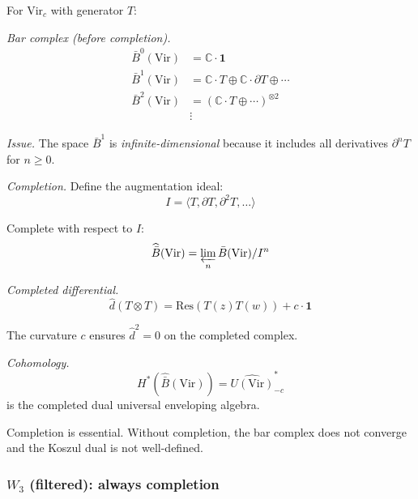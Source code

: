 \begin{example}\label{ex:vir-bar-completion}
For $\text{Vir}_c$ with generator $T$:

\emph{Bar complex (before completion).}
\begin{align}
\bar{B}^0(\text{Vir}) &= \mathbb{C} \cdot \mathbf{1} \\
\bar{B}^1(\text{Vir}) &= \mathbb{C} \cdot T \oplus \mathbb{C} \cdot \partial T \oplus \cdots \\
\bar{B}^2(\text{Vir}) &= (\mathbb{C} \cdot T \oplus \cdots)^{\otimes 2} \\
&\vdots
\end{align}

\emph{Issue.} The space $\bar{B}^1$ is \emph{infinite-dimensional} because it includes 
all derivatives $\partial^n T$ for $n \geq 0$.

\emph{Completion.} Define the augmentation ideal:
\[I = \langle T, \partial T, \partial^2 T, \ldots \rangle\]

Complete with respect to $I$:
\[\widehat{\bar{B}}(\text{Vir}) = \varprojlim_n \bar{B}(\text{Vir})/I^n\]

\emph{Completed differential.}
\[\widehat{d}(T \otimes T) = \text{Res}(T(z)T(w)) + c \cdot \mathbf{1}\]

The curvature $c$ ensures $\widehat{d}^2 = 0$ on the completed complex.

\emph{Cohomology.}
\[H^*(\widehat{\bar{B}}(\text{Vir})) = \widehat{U(\text{Vir})}^*_{-c}\]
is the completed dual universal enveloping algebra.

Completion is essential. Without completion, the bar complex does not converge and the
Koszul dual is not well-defined.
\end{example}

\subsubsection{\texorpdfstring{$W_3$ (filtered): always completion}{W-3 (filtered): always completion}}

